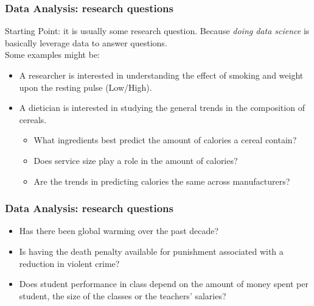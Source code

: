 \documentclass{beamer}
\begin{document}
\begin{frame}
\frametitle{Data Analysis: research questions}
Starting Point: it is usually some research question. Because \textit{doing data science} is basically leverage data to answer questions.\\[15pt]
Some examples might be: \\[10pt]
\begin{itemize}
\item A researcher is interested in understanding the effect of smoking and weight upon the resting pulse (Low/High).\\[15pt]
\item A dietician is interested in studying the general trends in the composition of cereals.
\begin{itemize}
\item What ingredients best predict the amount of calories a cereal contain?
\item Does service size play a role in the amount of calories?
\item Are the trends in predicting calories the same across manufacturers?
\end{itemize}
\end{itemize}
\end{frame}
\begin{frame}
\frametitle{Data Analysis: research questions}
\begin{itemize}
\item Has there been global warming over the past decade?\\[15pt]
\item Is having the death penalty available for punishment associated with a reduction in violent crime?\\[15pt]
\item Does student performance in class depend on the amount of money spent per student, the size of the classes or the teachers' salaries?
\end{itemize}
\end{frame}
\end{document}

